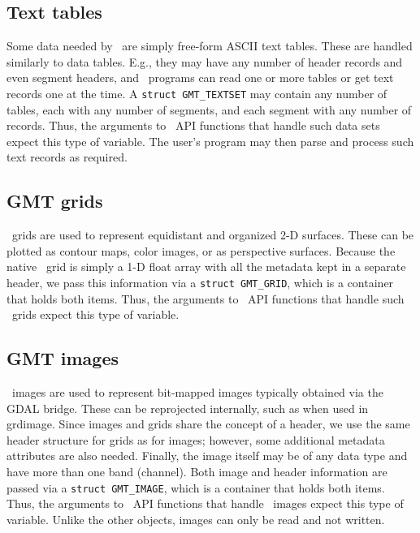 \documentclass[11pt]{report}
\begin{document}
\subsection{Text tables}

Some data needed by \GMT\ are simply free-form ASCII text tables.  These are handled
similarly to data tables.  E.g., they may have any number of header records and even segment headers,
and \GMT\ programs can read one or more tables or get text records one at the time.
A \texttt{struct GMT\_TEXTSET} may contain
any number of tables, each with any number of segments, and each segment with any number of records.   Thus, the
arguments to \GMT\ API functions that handle such data sets expect this type of variable.  The user's
program may then parse and process such text records as required.

\subsection{GMT grids}

\GMT\ grids are used to represent equidistant and organized 2-D surfaces.  These can be
plotted as contour maps, color images, or as perspective surfaces.  Because the native
\GMT\ grid is simply a 1-D float array with all the metadata kept in a separate header, we
pass this information via a \texttt{struct GMT\_GRID}, which is a container that holds both items.
Thus, the arguments to \GMT\ API functions that handle such \GMT\ grids expect this type
of variable.

\subsection{GMT images}

\GMT\ images are used to represent bit-mapped images typically obtained via the GDAL bridge.  These can be
reprojected internally, such as when used in grdimage.  Since images and grids share the concept
of a header, we use the same header structure for grids as for images; however, some additional
metadata attributes are also needed.  Finally, the image itself may be of any data type and have more than one band (channel).
Both image and header information are passed via a \texttt{struct GMT\_IMAGE}, which is a container that holds both items.
Thus, the arguments to \GMT\ API functions that handle \GMT\ images expect this type
of variable.  Unlike the other objects, images can only be read and not written.
\end{document}
